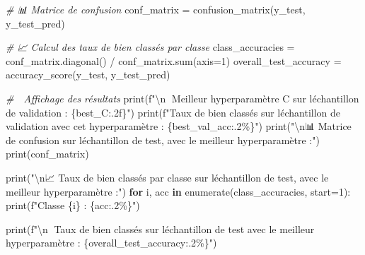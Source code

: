 \documentclass[
  letterpaper,
  DIV=11,
  numbers=noendperiod]{scrartcl}
\newenvironment{Shaded}{}{}
\newcommand{\BuiltInTok}[1]{\textcolor[rgb]{0.00,0.50,0.00}{#1}}
\newcommand{\CharTok}[1]{\textcolor[rgb]{0.25,0.44,0.63}{#1}}
\newcommand{\CommentTok}[1]{\textcolor[rgb]{0.38,0.63,0.69}{\textit{#1}}}
\newcommand{\ControlFlowTok}[1]{\textcolor[rgb]{0.00,0.44,0.13}{\textbf{#1}}}
\newcommand{\DecValTok}[1]{\textcolor[rgb]{0.25,0.63,0.44}{#1}}
\newcommand{\KeywordTok}[1]{\textcolor[rgb]{0.00,0.44,0.13}{\textbf{#1}}}
\newcommand{\NormalTok}[1]{#1}
\newcommand{\OperatorTok}[1]{\textcolor[rgb]{0.40,0.40,0.40}{#1}}
\newcommand{\SpecialCharTok}[1]{\textcolor[rgb]{0.25,0.44,0.63}{#1}}
\newcommand{\SpecialStringTok}[1]{\textcolor[rgb]{0.73,0.40,0.53}{#1}}
\newcommand{\StringTok}[1]{\textcolor[rgb]{0.25,0.44,0.63}{#1}}
\begin{document}
\begin{Shaded}
\begin{Highlighting}[]
\CommentTok{\# 📊 Matrice de confusion}
\NormalTok{conf\_matrix }\OperatorTok{=}\NormalTok{ confusion\_matrix(y\_test, y\_test\_pred)}

\CommentTok{\# 📈 Calcul des taux de bien classés par classe}
\NormalTok{class\_accuracies }\OperatorTok{=}\NormalTok{ conf\_matrix.diagonal() }\OperatorTok{/}\NormalTok{ conf\_matrix.}\BuiltInTok{sum}\NormalTok{(axis}\OperatorTok{=}\DecValTok{1}\NormalTok{)}
\NormalTok{overall\_test\_accuracy }\OperatorTok{=}\NormalTok{ accuracy\_score(y\_test, y\_test\_pred)}

\CommentTok{\# 📝 Affichage des résultats}
\BuiltInTok{print}\NormalTok{(}\SpecialStringTok{f"}\CharTok{\textbackslash{}n}\SpecialStringTok{🔹 Meilleur hyperparamètre C sur l\textquotesingle{}échantillon de validation : }\SpecialCharTok{\{}\NormalTok{best\_C}\SpecialCharTok{:.2f\}}\SpecialStringTok{"}\NormalTok{)}
\BuiltInTok{print}\NormalTok{(}\SpecialStringTok{f"Taux de bien classés sur l\textquotesingle{}échantillon de validation avec cet hyperparamètre : }\SpecialCharTok{\{}\NormalTok{best\_val\_acc}\SpecialCharTok{:.2\%\}}\SpecialStringTok{"}\NormalTok{)}
\BuiltInTok{print}\NormalTok{(}\StringTok{"}\CharTok{\textbackslash{}n}\StringTok{📊 Matrice de confusion sur l\textquotesingle{}échantillon de test, avec le meilleur hyperparamètre :"}\NormalTok{)}
\BuiltInTok{print}\NormalTok{(conf\_matrix)}

\BuiltInTok{print}\NormalTok{(}\StringTok{"}\CharTok{\textbackslash{}n}\StringTok{📈 Taux de bien classés par classe sur l\textquotesingle{}échantillon de test, avec le meilleur hyperparamètre  :"}\NormalTok{)}
\ControlFlowTok{for}\NormalTok{ i, acc }\KeywordTok{in} \BuiltInTok{enumerate}\NormalTok{(class\_accuracies, start}\OperatorTok{=}\DecValTok{1}\NormalTok{):}
    \BuiltInTok{print}\NormalTok{(}\SpecialStringTok{f"Classe }\SpecialCharTok{\{}\NormalTok{i}\SpecialCharTok{\}}\SpecialStringTok{ : }\SpecialCharTok{\{}\NormalTok{acc}\SpecialCharTok{:.2\%\}}\SpecialStringTok{"}\NormalTok{)}

\BuiltInTok{print}\NormalTok{(}\SpecialStringTok{f"}\CharTok{\textbackslash{}n}\SpecialStringTok{🔹 Taux de bien classés sur l\textquotesingle{}échantillon de test avec le meilleur hyperparamètre : }\SpecialCharTok{\{}\NormalTok{overall\_test\_accuracy}\SpecialCharTok{:.2\%\}}\SpecialStringTok{"}\NormalTok{)}
\end{Highlighting}
\end{Shaded}
\end{document}
